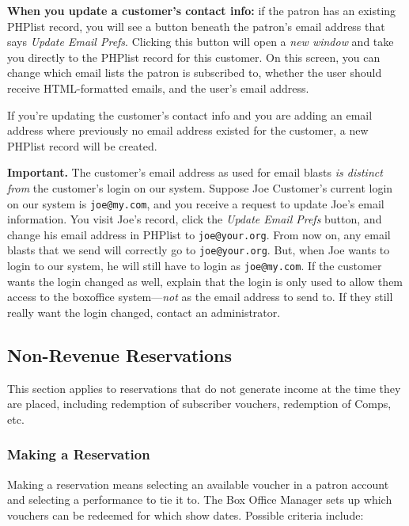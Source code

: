 \textbf{When you update a customer's contact info:} if the patron has an
existing PHPlist record, you will see a button beneath the patron's
email address that says \emph{Update Email Prefs}.  Clicking this button
will open a \emph{new window} and take you directly to the PHPlist
record for this customer.  On this screen, you can change which email
lists the patron is subscribed to, whether the user should receive
HTML-formatted emails, and the user's email address.

If you're updating the customer's contact info and you are adding an
email address where previously no email address existed for the
customer, a new PHPlist record will be created.  

\textbf{Important.}  The customer's email address as used for email
blasts \emph{is distinct from} the customer's login on our system.
Suppose Joe Customer's current login on our system is \verb+joe@my.com+,
and you receive a request to update Joe's email information.  You visit
Joe's record, click the \emph{Update Email Prefs} button, and change his
email address in PHPlist to \verb+joe@your.org+.  From now on, any email
blasts that we send will correctly go to \verb+joe@your.org+.  But, when
Joe wants to login to our system, he will still have to login as
\verb+joe@my.com+.  If the customer wants the login changed as
well, explain that the login is only used to allow them access to the
boxoffice system---\emph{not} as the email address to send to.  If they
still really want the login changed, contact an administrator.


\subsection{Non-Revenue Reservations}

This section applies to reservations that do not generate income at the
time they are placed, including redemption of subscriber vouchers,
redemption of Comps, etc.

\subsubsection{Making a Reservation}
\label{sec:reservation-details}

Making a reservation means selecting an available voucher in a patron
account and selecting a performance to tie it to.  The Box Office
Manager sets up which vouchers can be redeemed for which show dates.
Possible criteria include:

